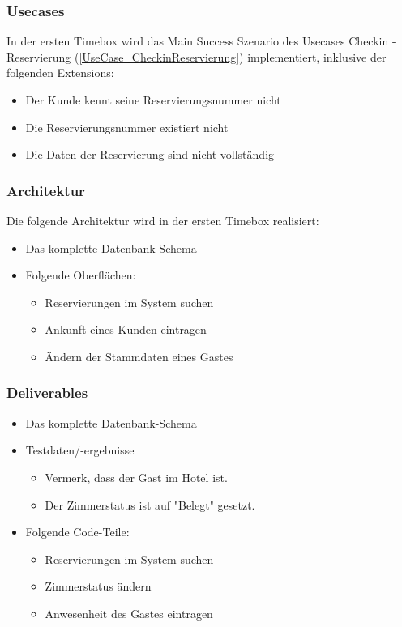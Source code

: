 \subsubsection{Usecases}
In der ersten Timebox wird das Main Success Szenario des Usecases Checkin - Reservierung (\ref{UseCase_CheckinReservierung}) implementiert,
inklusive der folgenden Extensions:

\begin{itemize}
	\item Der \Gls{Kunde} kennt seine \Gls{Reservierungsnummer} nicht
	\item Die \Gls{Reservierungsnummer} existiert nicht
	\item Die Daten der \Gls{Reservierung} sind nicht vollständig
\end{itemize}
\subsubsection{Architektur}
Die folgende Architektur wird in der ersten Timebox realisiert:

\begin{itemize}
	\item Das komplette Datenbank-Schema
	\item Folgende Oberflächen:
	\begin{itemize}
		\item \Gls{Reservierung}en im System suchen
		\item Ankunft eines \Gls{Kunde}n eintragen
		\item Ändern der \Gls{Stammdaten} eines \Gls{Gast}es
	\end{itemize}
\end{itemize}
\subsubsection{Deliverables}
\begin{itemize}
	\item Das komplette Datenbank-Schema
	\item Testdaten/-ergebnisse
	\begin{itemize}
		\item Vermerk, dass der \Gls{Gast} im Hotel ist.
		\item Der Zimmerstatus ist auf "Belegt" gesetzt.
	\end{itemize}

	\item Folgende Code-Teile:
	\begin{itemize}
		\item \Gls{Reservierung}en im System suchen
		\item Zimmerstatus ändern
		\item Anwesenheit des \Gls{Gast}es eintragen
	\end{itemize}
\end{itemize}

